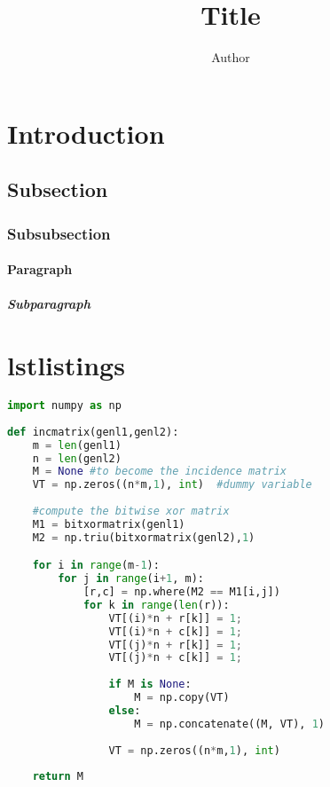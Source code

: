 \documentclass[10pt,titlepage]{article}
\title{Title}
\author{Author}
\begin{document}
\maketitle

\tableofcontents
\newpage

\section{Introduction}
\lipsum[1-1]

\subsection{Subsection}
\lipsum[2-3]

\subsubsection{Subsubsection}
\lipsum[2-3]

\paragraph{Paragraph}
\lipsum[1-2]

\subparagraph{Subparagraph}
\lipsum[1-2]

\section{lstlistings}
\begin{lstlisting}[language=python]
import numpy as np
    
def incmatrix(genl1,genl2):
    m = len(genl1)
    n = len(genl2)
    M = None #to become the incidence matrix
    VT = np.zeros((n*m,1), int)  #dummy variable
    
    #compute the bitwise xor matrix
    M1 = bitxormatrix(genl1)
    M2 = np.triu(bitxormatrix(genl2),1) 

    for i in range(m-1):
        for j in range(i+1, m):
            [r,c] = np.where(M2 == M1[i,j])
            for k in range(len(r)):
                VT[(i)*n + r[k]] = 1;
                VT[(i)*n + c[k]] = 1;
                VT[(j)*n + r[k]] = 1;
                VT[(j)*n + c[k]] = 1;
                
                if M is None:
                    M = np.copy(VT)
                else:
                    M = np.concatenate((M, VT), 1)
                
                VT = np.zeros((n*m,1), int)
    
    return M
\end{lstlisting}
\end{document}
